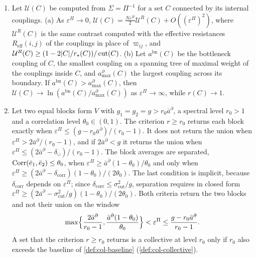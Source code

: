 \begin{theorem}
\begin{enumerate}
\begin{equation}\label{eq:col-corr}
\frac{2\bar a^\partial-\delta_{\mathrm{corr}}}{2\varepsilon^\Pi+2\bar a^\partial-\delta_{\mathrm{corr}}}\le\Corr(\bar e_1,\bar e_2)\le\frac{\bar a^\partial}{\varepsilon^\Pi+\bar a^\partial},\qquad\delta_{\mathrm{corr}}=\frac{\sigma^2_{\mathrm{cut}}}{\varepsilon^\Pi+g_{\min}},
\end{equation}
with equality on the right for equitable partitions.
\item[(iii)] Let $\mathcal U(C)$ be computed from $\Sigma=\Pi^{-1}$ for a set $C$ connected by its internal couplings. (a) As $\varepsilon^\Pi\to0$, $\mathcal U(C)=\frac{N\varepsilon^\Pi}{2}\mathcal U^R(C)+O((\varepsilon^\Pi)^2)$, where $\mathcal U^R(C)$ is the same contrast computed with the effective resistances $R_{\mathrm{eff}}(i,j)$ of the couplings in place of $\varpi_{ij}$, and $\mathcal U^R(C)\ge(1-2|C|/r_\star(C))/\operatorname{cut}(C)$. (b) Let $a^{\mathrm{bn}}(C)$ be the bottleneck coupling of $C$, the smallest coupling on a spanning tree of maximal weight of the couplings inside $C$, and $a^\partial_{\max}(C)$ the largest coupling across its boundary. If $a^{\mathrm{bn}}(C)>a^\partial_{\max}(C)$, then $\mathcal U(C)\to\ln(a^{\mathrm{bn}}(C)/a^\partial_{\max}(C))$ as $\varepsilon^\Pi\to\infty$, while $r(C)\to1$.
\item[(iv)] Let two equal blocks form $V$ with $g_1=g_2=g>r_0\bar a^\partial$, a spectral level $r_0>1$ and a correlation level $\theta_0\in(0,1)$. The criterion $r\ge r_0$ returns each block exactly when $\varepsilon^\Pi\le(g-r_0\bar a^\partial)/(r_0-1)$. It does not return the union when $\varepsilon^\Pi>2\bar a^\partial/(r_0-1)$, and if $2\bar a^\partial<g$ it returns the union when $\varepsilon^\Pi\le(2\bar a^\partial-\delta_\cup)/(r_0-1)$. The block averages are separated, $\operatorname{Corr}(\bar e_1,\bar e_2)\le\theta_0$, when $\varepsilon^\Pi\ge\bar a^\partial(1-\theta_0)/\theta_0$ and only when $\varepsilon^\Pi\ge(2\bar a^\partial-\delta_{\mathrm{corr}})(1-\theta_0)/(2\theta_0)$. The last condition is implicit, because $\delta_{\mathrm{corr}}$ depends on $\varepsilon^\Pi$; since $\delta_{\mathrm{corr}}\le\sigma^2_{\mathrm{cut}}/g$, separation requires in closed form $\varepsilon^\Pi\ge(2\bar a^\partial-\sigma^2_{\mathrm{cut}}/g)(1-\theta_0)/(2\theta_0)$. Both criteria return the two blocks and not their union on the window
\begin{equation}\label{eq:col-window}
\max\Bigl\{\frac{2\bar a^\partial}{r_0-1},\frac{\bar a^\partial(1-\theta_0)}{\theta_0}\Bigr\}<\varepsilon^\Pi\le\frac{g-r_0\bar a^\partial}{r_0-1}.
\end{equation}
A set that the criterion $r\ge r_0$ returns is a collective at level $r_0$ only if $r_0$ also exceeds the baseline of \cref{def:col-baseline} (\cref{def:col-collective}).
\end{enumerate}
\end{theorem}
